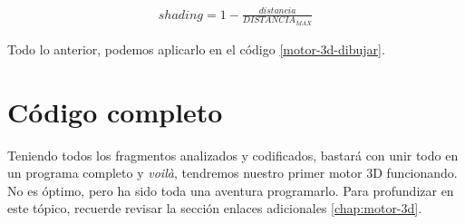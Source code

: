 \begin{equation}
\begin{aligned}
\label{eq-techo-completa}
shading = 1 - \frac{distancia}{DISTANCIA_{MAX}}
\end{aligned}
\end{equation}

Todo lo anterior, podemos aplicarlo en el código \ref{motor-3d-dibujar}.



\section{Código completo}

Teniendo todos los fragmentos analizados y codificados, bastará con unir todo en un programa completo y \emph{voilà}, tendremos nuestro primer motor 3D funcionando. No es óptimo, pero ha sido toda una aventura programarlo. Para profundizar en este tópico, recuerde revisar la sección enlaces adicionales \autoref{chap:motor-3d}.



